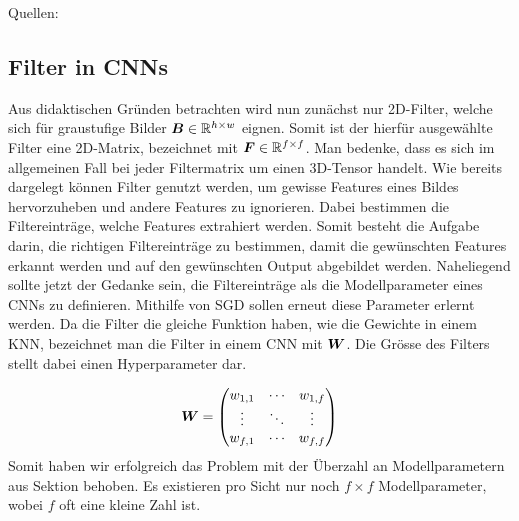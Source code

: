 \para{}
Quellen: \cite{deeplearning.ai:cnn} \cite{wiki:kernel} \cite{net:gimp_conv}


\subsection{Filter in CNNs}
Aus didaktischen Gründen betrachten wird nun zunächst
nur 2D-Filter, welche sich für graustufige Bilder
$\bm{B} \in \mathbb{R}^{h \times w}$ eignen. Somit ist der hierfür ausgewählte
Filter eine 2D-Matrix, bezeichnet mit $\bm{F} \in \mathbb{R}^{f \times
  f}$. Man bedenke, dass es sich im allgemeinen Fall bei jeder Filtermatrix
um einen 3D-Tensor handelt.
\para{}
Wie bereits dargelegt können Filter genutzt werden, um gewisse
Features eines Bildes hervorzuheben und andere Features zu ignorieren. Dabei
bestimmen die Filtereinträge, welche Features extrahiert werden. Somit besteht
die Aufgabe darin, die richtigen Filtereinträge zu bestimmen, damit die
gewünschten Features erkannt werden und auf den gewünschten Output abgebildet
werden. Naheliegend sollte jetzt der Gedanke sein, die Filtereinträge als die
Modellparameter eines CNNs zu definieren.
Mithilfe von SGD sollen erneut diese Parameter
erlernt werden.
\para{}
Da die Filter die gleiche Funktion haben, wie die Gewichte in einem KNN,
bezeichnet man die Filter in einem CNN mit $\bm{W}$. Die Grösse des Filters
stellt dabei einen Hyperparameter dar.

\begin{equation*}
  \bm{W} = \begin{pmatrix}
    w_{1,1} & \cdots & w_{1,f} \\
    \vdots & \ddots & \vdots \\
    w_{f,1} & \cdots & w_{f,f}
  \end{pmatrix}
\end{equation*}
Somit haben wir erfolgreich das Problem mit der Überzahl an Modellparametern aus
Sektion  behoben. Es existieren pro Sicht nur noch $f \times f$
Modellparameter, wobei $f$ oft eine kleine Zahl ist.



